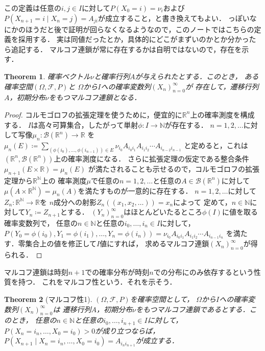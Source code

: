 \documentclass[dvipdfmx,autodetect-engine]{jsarticle}
\newtheorem{theorem}{Theorem}[section]
\theoremstyle{remark}
\theoremstyle{definition}
\newcommand{\R}{\mathbb{R}}
\newcommand{\N}{\mathbb{N}}
\begin{document}
この定義は任意の$i,j \in I$に対して$P(X_0 = i)=\nu_{i}$および
$P(X_{n+1} = i \mid X_n = j)= A_{ji}$が成立すること，と書き換えてもよい．
っぽいなにかのほうだと後で証明が回らなくなるようなので，このノートではこちらの定義を採用する．
実は同値だったとか，具体的にどこがまずいのかとか分かったら追記する．
マルコフ連鎖が常に存在するかは自明ではないので，存在を示す．


\begin{theorem}
    確率ベクトル$\nu$と確率行列$A$が与えられたとする．このとき，
    ある確率空間$(\Omega,\mathcal{F},P)$と
    $\Omega$から$I$への確率変数列$(X_n)_{n=0}^{\infty}$が
    存在して，遷移行列$A$，初期分布$\nu$をもつマルコフ連鎖となる．
\end{theorem}

\begin{proof}
    コルモゴロフの拡張定理を使うために，便宜的に$\R^n$上の確率測度を構成する．
    $I$は高々可算集合，したがって単射$\phi \colon I \to \N$が存在する．
    $n =1,2,\ldots $に対して写像$\mu_n \colon \mathcal{B}(\R^n) \to \R$
    を$\mu_n (E) \coloneqq \sum_{(\phi(i_0),\ldots,\phi(i_{n-1}) ) \in E} 
    \nu_{i_0} A_{i_0 i_1} A_{i_1 i_2} \cdots A_{i_{n-2} i_{n-1}}$
    と定めると，これは$(\R^n , \mathcal{B}(\R^n))$上の確率測度になる．
    さらに拡張定理の仮定である整合条件$\mu_{n+1}(E\times \R) = \mu_n (E)$
    が満たされることも示せるので，コルモゴロフの拡張定理から$\R^{\N}$上の
    確率測度$\mu$で任意の$n=1,2,\ldots$と任意の$A \in \mathcal{B}(\R^n)$に対して
    $\mu(A\times \R^{\N}) = \mu_n(A)$を満たすものが一意的に存在する．
    $n=1,2,\ldots$に対して$Z_n \colon\R^{\N} \to \R$を
    $n$成分への射影$Z_n((x_1,x_2,\ldots))=x_n$によって
    定めて，$n \in \N$に対して$Y_n \coloneqq Z_{n+1}$とする．
    $(Y_n)_{n=0}^{\infty}$はほとんどいたるところ$\phi(I)$に値を取る確率変数列で，
    任意の$n \in \N$と任意の$i_0,\ldots,i_{n} \in I$に対して，
    $P(Y_{0} = \phi(i_{0}), Y_{1}=\phi(i_{1}),\ldots,Y_n = \phi(i_n)) = 
    \nu_{i_0} A_{i_0 i_1} A_{i_1 i_2}\cdots A_{i_{n-1} i_n}$
    を満たす．零集合上の値を修正して$I$値にすれば，
    求めるマルコフ連鎖$(X_n)_{n=0}^{\infty}$が得られる．
\end{proof}

マルコフ連鎖は時刻$n+1$での確率分布が時刻$n$での分布にのみ依存するという性質を持つ．
これをマルコフ性という．それを示そう．

\begin{theorem}[マルコフ性1]
    $(\Omega,\mathcal{F},P)$を確率空間として，
    $\Omega$から$I$への確率変数列$(X_n)_{n=0}^{\infty}$は
    遷移行列$A$，初期分布$\nu$をもつマルコフ連鎖であるとする．このとき，
    任意の$n \in \N$と任意の$i_0,\ldots,i_{n+1} \in I$に対して，
    $P(X_n = i_n,\ldots,X_0 = i_0) >0$が成り立つならば，
    $P(X_{n+1} \mid X_n = i_n,\ldots,X_0 = i_0)=A_{i_n i_{n+1}}$が成立する．
\end{theorem}
\end{document}
